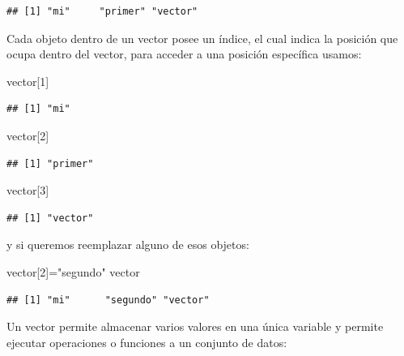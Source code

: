 \documentclass[
]{book}
\newenvironment{Shaded}{\begin{snugshade}}{\end{snugshade}}
\newcommand{\DecValTok}[1]{\textcolor[rgb]{0.00,0.00,0.81}{#1}}
\newcommand{\NormalTok}[1]{#1}
\newcommand{\OtherTok}[1]{\textcolor[rgb]{0.56,0.35,0.01}{#1}}
\newcommand{\StringTok}[1]{\textcolor[rgb]{0.31,0.60,0.02}{#1}}
\begin{document}
\begin{verbatim}
## [1] "mi"     "primer" "vector"
\end{verbatim}

Cada objeto dentro de un vector posee un índice, el cual indica la
posición que ocupa dentro del vector, para acceder a una posición
específica usamos:

\begin{Shaded}
\begin{Highlighting}[]
\NormalTok{vector[}\DecValTok{1}\NormalTok{]}
\end{Highlighting}
\end{Shaded}

\begin{verbatim}
## [1] "mi"
\end{verbatim}

\begin{Shaded}
\begin{Highlighting}[]
\NormalTok{vector[}\DecValTok{2}\NormalTok{]}
\end{Highlighting}
\end{Shaded}

\begin{verbatim}
## [1] "primer"
\end{verbatim}

\begin{Shaded}
\begin{Highlighting}[]
\NormalTok{vector[}\DecValTok{3}\NormalTok{] }
\end{Highlighting}
\end{Shaded}

\begin{verbatim}
## [1] "vector"
\end{verbatim}

y si queremos reemplazar alguno de esos objetos:

\begin{Shaded}
\begin{Highlighting}[]
\NormalTok{vector[}\DecValTok{2}\NormalTok{]}\OtherTok{=}\StringTok{"segundo"}
\NormalTok{vector}
\end{Highlighting}
\end{Shaded}

\begin{verbatim}
## [1] "mi"      "segundo" "vector"
\end{verbatim}

Un vector permite almacenar varios valores en una única variable y
permite ejecutar operaciones o funciones a un conjunto de datos:
\end{document}
